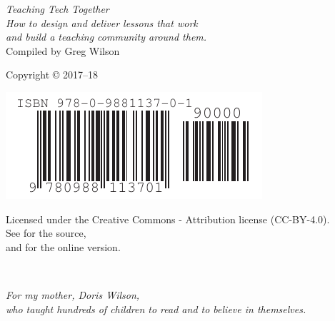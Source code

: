 \pagestyle{empty}

{\begingroup
  \raggedleft
  \vspace*{\baselineskip}

  {\Huge\itshape Teaching Tech Together}\\[\baselineskip]

  {\large\itshape
    How to design and deliver lessons that work \\
    and build a teaching community around them.
  }\\[0.2\textheight]

  {\large Compiled by Greg Wilson}\par

  \vfill

  {\large Copyright {\copyright} 2017--18}

  \vspace*{\baselineskip}

  \includegraphics{../docs/fig/isbn-barcode.pdf}

  \vspace*{\baselineskip}

  {\small
    Licensed under the Creative Commons - Attribution license (CC-BY-4.0).
    \\
    See {\repository} for the source,\\
    and {\website} for the online version.
  }

\endgroup}

\newpage

\pagestyle{empty}

~

\newpage

\pagestyle{empty}

\vspace*{1.5in}

\begin{center}
{\em
For my mother, Doris Wilson,\\
who taught hundreds of children to read and to believe in themselves.
}
\end{center}

\vspace*{3\baselineskip}

